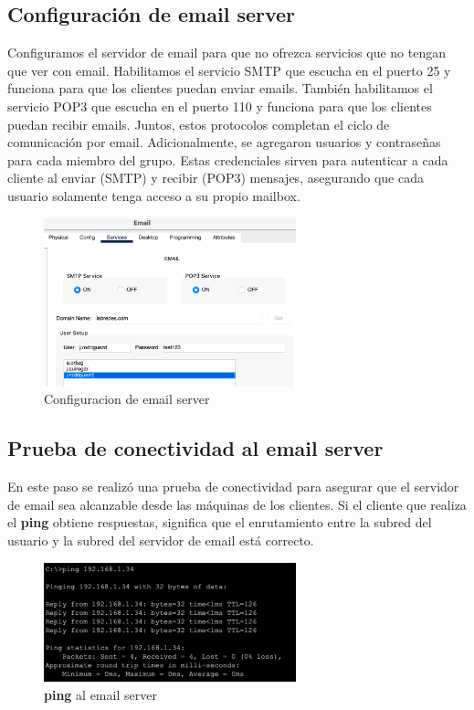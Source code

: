 \documentclass[10pt]{article}
\begin{document}
\subsection{Configuración de email server}
Configuramos el servidor de email para que no ofrezca servicios que no tengan que ver con email. Habilitamos el servicio SMTP que escucha en el puerto 25 y funciona para que los clientes puedan enviar emails. También habilitamos el servicio POP3 que escucha en el puerto 110 y funciona para que los clientes puedan recibir emails. Juntos, estos protocolos completan el ciclo de comunicación por email. Adicionalmente, se agregaron usuarios y contraseñas para cada miembro del grupo. Estas credenciales sirven para autenticar a cada cliente al enviar (SMTP) y recibir (POP3) mensajes, asegurando que cada usuario solamente tenga acceso a su propio mailbox.


\begin{figure}[H]
    \centering
    \includegraphics[width=0.65\textwidth]{lab-01-screenshots/45-1-email-config.png}
    \caption{Configuracion de email server}
\end{figure}


\subsection{Prueba de conectividad al email server}
En este paso se realizó una prueba de conectividad para asegurar que el servidor de email sea alcanzable desde las máquinas de los clientes. Si el cliente que realiza el \textbf{ping} obtiene respuestas, significa que el enrutamiento entre la subred del usuario y la subred del servidor de email está correcto.

\begin{figure}[H]
    \centering
    \includegraphics[width=0.65\textwidth]{lab-01-screenshots/45-2-ping-email}
    \caption{\textbf{ping} al email server}
\end{figure}
\end{document}
